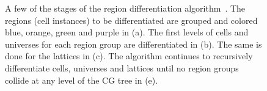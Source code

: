\begin{figure}[h!]
\begin{subfigure}{\textwidth}
  \caption{}
  \label{fig:differentation-5}
\end{subfigure}
\caption{A few of the stages of the region differentiation algorithm~\cite{boyd2015opencg}. The regions (cell instances) to be differentiated are grouped and colored blue, orange, green and purple in (a). The first levels of cells and universes for each region group are differentiated in (b). The same is done for the lattices in (c). The algorithm continues to recursively differentiate cells, universes and lattices until no region groups collide at any level of the CG tree in (e).}
\label{fig:region-differentiation}
\end{figure}